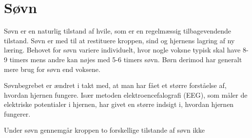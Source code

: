 \section{Søvn}\label{sec:Soevn_generelt}
Søvn er en naturlig tilstand af hvile, som er en regelmæssig tilbagevendende tilstand. Søvn er med til at restituere kroppen, sind og hjernens lagring af ny læring. Behovet for søvn variere individuelt, hvor nogle voksne typisk skal have 8-9 timers mens andre kan nøjes med 5-6 timers søvn. Børn derimod har generalt mere brug for søvn end voksene. 

Søvnbegrebet er ændret i takt med, at man har fået et større forståelse af, hvordan hjernen fungere. Især metoden elektroencefalografi (EEG), som måler de elektriske potentialer i hjernen, har givet en større indsigt i, hvordan hjernen fungerer.

Under søvn gennemgår kroppen to forskellige tilstande af søvn ikke  
